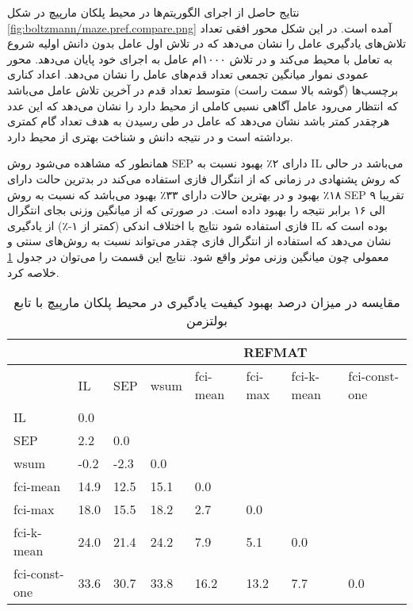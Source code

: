  نتایج حاصل از اجرای الگوریتم‌ها در محیط پلکان مارپیچ در شکل
\ref{fig:boltzmann/maze.pref.compare.png}
آمده است. در این شکل محور افقی تعداد تلاش‌های یادگیری عامل را نشان می‌دهد که در تلاش اول عامل بدون دانش اولیه شروع به تعامل با محیط می‌کند و در تلاش ۱۰۰۰ام عامل به اجرای خود پایان می‌دهد. محور عمودی نموار میانگین تجمعی تعداد قدم‌های عامل را نشان می‌دهد. اعداد کناری برچسب‌ها (گوشه بالا سمت راست) متوسط تعداد قدم‌ در آخرین تلاش عامل می‌باشد که انتظار می‌رود عامل آگاهی نسبی کاملی از محیط دارد را نشان می‌دهد که این عدد هرچقدر کمتر باشد نشان می‌دهد که عامل در طی رسیدن به هدف تعداد گام کمتری برداشته است و در نتیجه دانش و شناخت بهتری از محیط دارد.


همانطور که مشاهده می‌شود روش SEP دارای ۲٪ بهبود نسبت به IL می‌باشد در حالی که روش پشنهادی در زمانی که از انتگرال فازی استفاده می‌کند در بدترین حالت دارای ۱۸٪ بهبود و در بهترین حالات دارای ۳۳٪ بهبود می‌باشد که نسبت به روش SEP تقریبا ۹ الی ۱۶ برابر نتیجه را بهبود داده است. در صورتی که از میانگین وزنی بجای انتگرال فازی استفاده شود نتایج با اختلاف اندکی (کمتر از ۱-٪)  از یادگیری IL بوده است که نشان ‌می‌دهد که استفاده از انتگرال فازی چقدر می‌تواند نسبت به روش‌های سنتی و معمولی چون میانگین وزنی موثر واقع شود. نتایج این قسمت را می‌توان در جدول
\ref{tab:maze_pref_compare}
خلاصه کرد.

\begin{table}
\centering
\caption{مقایسه در میزان درصد بهبود کیفیت یادگیری در محیط پلکان مارپیچ با تابع بولتزمن}\label{tab:maze_pref_compare}
\begin{latin}
\begin{tabular}{|*8{l|}}
\hline
\multicolumn{3}{|c|}{}& \multicolumn{5}{c|}{REFMAT}
\\\hline
& IL & SEP & wsum & fci-mean & fci-max & fci-k-mean & fci-const-one
\\\hline
IL &0.0 & & & & & &
\\\hline
SEP &2.2 &0.0 & & & & &
\\\hline
wsum &-0.2 &-2.3 &0.0 & & & &
\\\hline
fci-mean &14.9 &12.5 &15.1 &0.0 & & &
\\\hline
fci-max &18.0 &15.5 &18.2 &2.7 &0.0 & &
\\\hline
fci-k-mean &24.0 &21.4 &24.2 &7.9 &5.1 &0.0 &
\\\hline
fci-const-one &33.6 &30.7 &33.8 &16.2 &13.2 &7.7 &0.0
\\\hline
\end{tabular}
\end{latin}
\end{table}

